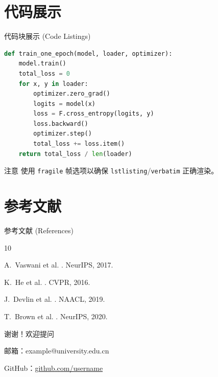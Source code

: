 \documentclass[aspectratio=169, 10pt, UTF8]{ctexbeamer}
\begin{document}
\section{代码展示}

\begin{frame}[fragile]{代码块展示 (Code Listings)}
  \begin{lstlisting}[language=Python, caption={PyTorch 训练循环示例}]
def train_one_epoch(model, loader, optimizer):
    model.train()
    total_loss = 0
    for x, y in loader:
        optimizer.zero_grad()
        logits = model(x)
        loss = F.cross_entropy(logits, y)
        loss.backward()
        optimizer.step()
        total_loss += loss.item()
    return total_loss / len(loader)
  \end{lstlisting}

  \begin{alertblock}{注意}
    使用 \texttt{fragile} 帧选项以确保 \texttt{lstlisting}/\texttt{verbatim} 正确渲染。
  \end{alertblock}
\end{frame}

\section{参考文献}

\begin{frame}[allowframebreaks]{参考文献 (References)}
  \begin{thebibliography}{10}
    \beamertemplatebookbibitems

    A.~Vaswani et al.
    .
    \newblock NeurIPS, 2017.

    K.~He et al.
    .
    \newblock CVPR, 2016.

    J.~Devlin et al.
    .
    \newblock NAACL, 2019.

    T.~Brown et al.
    .
    \newblock NeurIPS, 2020.
  \end{thebibliography}
\end{frame}

\begin{frame}[plain]
  \centering
  \vfill
  {\huge\color{ieeeBlue} 谢谢！欢迎提问}

  \vspace{20pt}
  {\large 邮箱：example@university.edu.cn}

  \vspace{8pt}
  {\large GitHub：\href{https://github.com/username}{github.com/username}}
  \vfill
\end{frame}
\end{document}
